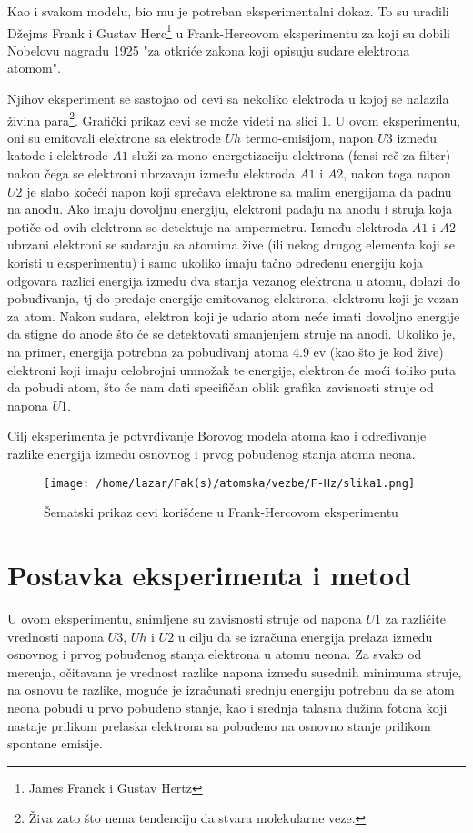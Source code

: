 \documentclass[12pt,a4paper]{article}
\begin{document}
Kao i svakom modelu, bio mu je potreban eksperimentalni dokaz. To su uradili Džejms Frank i Gustav Herc\footnote{James Franck i Gustav Hertz} u Frank-Hercovom eksperimentu za koji su dobili Nobelovu nagradu 1925 "za otkriće zakona koji opisuju sudare elektrona atomom". 

Njihov eksperiment se sastojao od cevi sa nekoliko elektroda u kojoj se nalazila živina para\footnote{Živa zato što nema tendenciju da stvara molekularne veze.}. Grafički prikaz cevi se može videti na slici 1. U ovom eksperimentu, oni su emitovali elektrone sa elektrode $Uh$ termo-emisijom, napon $U3$ između katode i elektrode $A1$ služi za mono-energetizaciju elektrona (fensi reč za filter) nakon čega se elektroni ubrzavaju između elektroda $A1$ i $A2$, nakon toga napon $U2$ je slabo kočeći napon koji sprečava elektrone sa malim energijama da padnu na anodu. Ako imaju dovoljnu energiju, elektroni padaju na anodu i struja koja potiče od ovih elektrona se detektuje na ampermetru. Između elektroda $A1$ i $A2$ ubrzani elektroni se sudaraju sa atomima žive (ili nekog drugog elementa koji se koristi u eksperimentu) i samo ukoliko imaju tačno određenu energiju koja odgovara razlici energija između dva stanja vezanog elektrona u atomu, dolazi do pobuđivanja, tj do predaje energije emitovanog elektrona, elektronu koji je vezan za atom. Nakon sudara, elektron koji je udario atom neće imati dovoljno energije da stigne do anode što će se detektovati smanjenjem struje na anodi. Ukoliko je, na primer, energija potrebna za pobuđivanj atoma 4.9 ev (kao što je kod žive) elektroni koji imaju celobrojni umnožak te energije, elektron će moći toliko puta da pobudi atom, što će nam dati specifičan oblik grafika zavisnosti struje od napona $U1$.

Cilj eksperimenta je potvrđivanje Borovog modela atoma kao i određivanje razlike energija između osnovnog i prvog pobuđenog stanja atoma neona. 

\begin{figure}[H]
\centering
\texttt{[image: /home/lazar/Fak(s)/atomska/vezbe/F-Hz/slika1.png]}
\caption{Šematski prikaz cevi korišćene u Frank-Hercovom eksperimentu}
\end{figure}

\section*{Postavka eksperimenta i metod}

U ovom eksperimentu, snimljene su zavisnosti struje od napona $U1$ za različite vrednosti napona $U3$, $Uh$ i $U2$ u cilju da se izračuna energija prelaza između osnovnog i prvog pobuđenog stanja elektrona u atomu neona. Za svako od merenja, očitavana je vrednost razlike napona  između susednih minimuma struje, na osnovu te razlike, moguće je izračunati srednju energiju potrebnu da se atom neona pobudi u prvo pobuđeno stanje, kao i srednja talasna dužina fotona koji nastaje prilikom prelaska elektrona sa pobuđeno na osnovno stanje prilikom spontane emisije.
\end{document}
